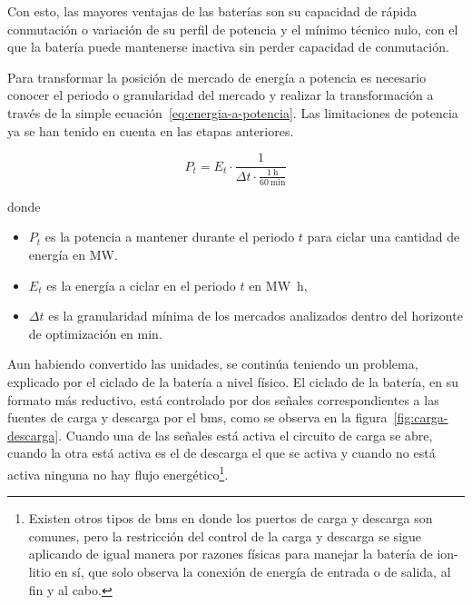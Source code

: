 Con esto, las mayores ventajas de las baterías son su capacidad de rápida conmutación o variación de su perfil de potencia y el mínimo técnico nulo, con el que la batería puede mantenerse inactiva sin perder capacidad de conmutación.

Para transformar la posición de mercado de energía a potencia es necesario conocer el periodo o granularidad del mercado y realizar la transformación a través de la simple ecuación~\ref{eq:energia-a-potencia}. Las limitaciones de potencia ya se han tenido en cuenta en las etapas anteriores.

\begin{samepage}

  \begin{equation}%
    \label{eq:energia-a-potencia}
    P_{t} = E_{t} \cdot \frac{1}{\Delta t \cdot \frac{\SI{1}{\hour}}{\SI{60}{\minute}}}
  \end{equation}

  donde

  \begin{itemize}

    \item \( P_{t} \) es la potencia a mantener durante el periodo \( t \) para ciclar una cantidad de energía en \si{\mega\watt}.

    \item \( E_{t} \) es la energía a ciclar en el periodo \( t \) en \si{{\mega\watt\hour}},

    \item \( \Delta t \) es la granularidad mínima de los mercados analizados dentro del horizonte de optimización en \si{\minute}.

  \end{itemize}

\end{samepage}

Aun habiendo convertido las unidades, se continúa teniendo un problema, explicado por el ciclado de la batería a nivel físico. El ciclado de la batería, en su formato más reductivo, está controlado por dos señales correspondientes a las fuentes de carga y descarga por el \gls{bms}, como se observa en la figura~\ref{fig:carga-descarga}. Cuando una de las señales está activa el circuito de carga se abre, cuando la otra está activa es el de descarga el que se activa y cuando no está activa ninguna no hay flujo energético\footnote{Existen otros tipos de \gls{bms} en donde los puertos de carga y descarga son comunes, pero la restricción del control de la carga y descarga se sigue aplicando de igual manera por razones físicas para manejar la batería de ion-litio en sí, que solo observa la conexión de energía de entrada o de salida, al fin y al cabo.}.

